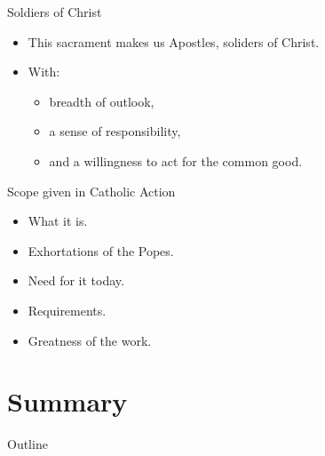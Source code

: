 \documentclass{beamer}
\begin{document}
\begin{frame}{Soldiers of Christ}
\begin{itemize}
\item
This sacrament makes us Apostles, soliders of Christ.
\item
With: \begin{itemize}
      \item breadth of outlook,
      \item a sense of responsibility,
      \item and a willingness to act for the common good.
\end{itemize}
\end{itemize}
\end{frame}

\begin{frame}{Scope given in Catholic Action}
\begin{itemize}
\item What it is.
\item Exhortations of the Popes.
\item Need for it today.
\item Requirements.
\item Greatness of the work.
\end{itemize}
\end{frame}

\section{Summary}

\begin{frame}{Outline}
  \tableofcontents
\end{frame}
\end{document}
